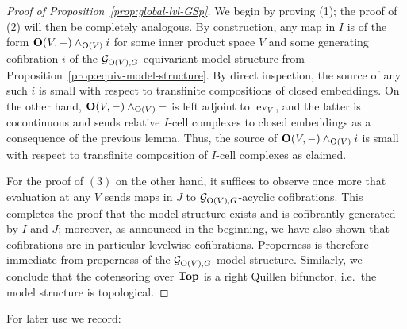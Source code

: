 \documentclass[reqno]{memo-l}
\theoremstyle{mythm}
\theoremstyle{definition}
\numberwithin{equation}{section}
\DeclareMathOperator{\ev}{ev}
\newcommand{\cat}[1]{\textbf{\textup{#1}}}
\renewcommand{\O}{{\textup{O}}}
\let\smashp=\wedge
\begin{document}
\begin{proof}[Proof of Proposition~\ref{prop:global-lvl-GSp}]
    We begin by proving (1); the proof of (2) will then be completely analogous. By construction, any map in $I$ is of the form $\cat{O}(V,-)\smashp_{\O(V)}i$ for some inner product space $V$ and some generating cofibration $i$ of the $\mathcal G_{\O(V),G}$-equivariant model structure from Proposition~\ref{prop:equiv-model-structure}. By direct inspection, the source of any such $i$ is small with respect to transfinite compositions of closed embeddings. On the other hand, $\cat{O}(V,-)\smashp_{\O(V)}{-}$ is left adjoint to $\ev_V$, and the latter is cocontinuous and sends relative $I$-cell complexes to closed embeddings as a consequence of the previous lemma. Thus, the source of $\cat{O}(V,-)\smashp_{\O(V)}i$ is small with respect to transfinite composition of $I$-cell complexes as claimed.

    For the proof of $(3)$ on the other hand, it suffices to observe once more that evaluation at any $V$ sends maps in $J$ to $\mathcal G_{\O(V),G}$-acyclic cofibrations. This completes the proof that the model structure exists and is cofibrantly generated by $I$ and $J$; moreover, as announced in the beginning, we have also shown that cofibrations are in particular levelwise cofibrations. Properness is therefore immediate from properness of the $\mathcal G_{\O(V),G}$-model structure. Similarly, we conclude that the cotensoring over $\cat{Top}$ is a right Quillen bifunctor, i.e.\ the model structure is topological.
\end{proof}

For later use we record:
\end{document}
